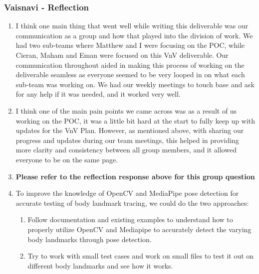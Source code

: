 \documentclass[12pt, titlepage]{article}
\begin{document}
\subsubsection*{Vaisnavi - Reflection}
\begin{enumerate}
  \item I think one main thing that went well while writing this deliverable was our communication as a group and how that played into the division of work. We had two sub-teams where Matthew and I were focusing on the POC, while Cieran, Maham and Eman were focused on this VnV deliverable. Our communication throughout aided in making this process of working on the deliverable seamless as everyone seemed to be very looped in on what each sub-team was working on. We had our weekly meetings to touch base and ask for any help if it was needed, and it worked very well.
  \item I think one of the main pain points we came across was as a result of us working on the POC, it was a little bit hard at the start to fully keep up with updates for the VnV Plan. However, as mentioned above, with sharing our progress and updates during our team meetings, this helped in providing more clarity and consistency between all group members, and it allowed everyone to be on the same page.
  \item \textbf{Please refer to the reflection response above for this group question}
  \item To improve the knowledge of OpenCV and MediaPipe pose detection for accurate testing of body landmark tracing, we could do the two approaches:
  \begin{enumerate}
    \item Follow documentation and existing examples to understand how to properly utilize OpenCV and Mediapipe to accurately detect the varying body landmarks through pose detection.
    \item Try to work with small test cases and work on small files to test it out on different body landmarks and see how it works.
  \end{enumerate}
\end{enumerate}
\end{document}
